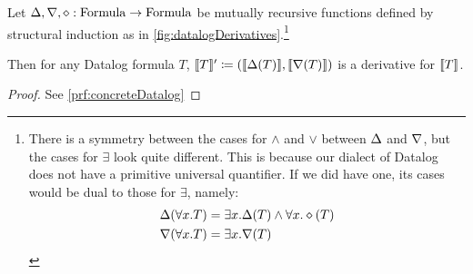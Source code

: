 \newcommand{\bothchanges}{\rho}
\begin{thm}[name=Concrete Datalog formula derivatives, restate=concreteDatalog]
\label{thm:concreteDatalog}
  Let $\Delta, \nabla, \diamond : \mathrm{Formula} \rightarrow \mathrm{Formula}$ be mutually recursive functions
  defined by structural induction as in \cref{fig:datalogDerivatives}.\footnote{
  There is a symmetry between the cases for $\wedge$ and $\vee$ between $\Delta$
  and $\nabla$, but the cases for $\exists$ look quite different.
  This is because our dialect of Datalog does not have a primitive universal quantifier.
  If we did have one, its cases would be dual to those for $\exists$, namely:
  \begin{align*}
  \Delta(\forall x.T) &= \exists x. \Delta(T) \wedge \forall x. \diamond(T)\\
  \nabla(\forall x.T) &= \exists x. \nabla(T)
  \end{align*}}

  Then for any Datalog formula $T$, 
  $\llbracket T \rrbracket' \coloneqq (\llbracket \Delta(T) \rrbracket, \llbracket \nabla(T) \rrbracket)$
  is a derivative for $\llbracket T \rrbracket$.
\end{thm}
\ifproofs
\begin{proof}
  See \cref{prf:concreteDatalog}
\end{proof}
\fi

